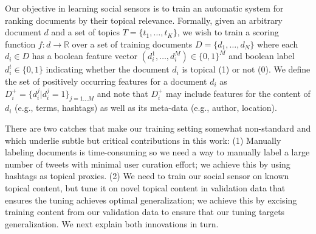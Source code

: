 

Our objective in learning social sensors is to train an automatic
system for ranking documents by their topical relevance.  Formally,
given an arbitrary document $d$ and a set of topics $T = \{
t_1,\ldots,t_K\}$, we wish to train a scoring function $f\!\!:\!\!d \rightarrow \mathbb{R}$
over a set of training documents $D = \{
d_1,\ldots,d_N \}$ where each $d_i \in D$ has a boolean feature vector
$(d_i^1,\ldots,d_i^M) \in \{0,1\}^M$ and boolean label $d_i^t \in \{
0,1 \}$ indicating whether the document $d_i$ is topical (1) or not
(0).  We define the set of positively occurring features for a document
$d_i$ as $D_i^+ = \{ d_i^j | d_i^j=1 \}_{j=1\ldots M}$ and note that
$D_i^+$ may include features for the content of $d_i$ (e.g., terms, 
hashtags) as well as its meta-data (e.g., author, location).

There are two catches that make our training setting somewhat
non-standard and which underlie subtle but critical contributions in this
work:  (1) Manually labeling documents is time-consuming so
we need a way to manually label a large number of tweets with minimal
user curation effort; we achieve this by using hashtags as topical proxies.
(2) We need to train our social sensor on
known topical content, but tune it on novel topical content in validation data
that ensures the tuning achieves optimal generalization; we achieve this by 
excising training content from our validation data to ensure that our tuning
targets generalization.  We next explain both innovations in turn.

%
%

